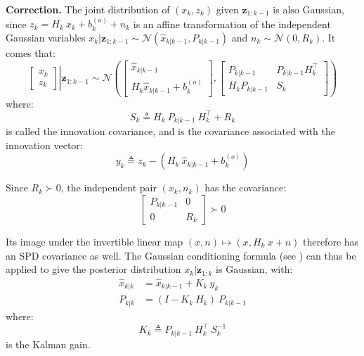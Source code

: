 \textbf{Correction.} The joint distribution of $(x_k,z_k)$ given $\mathbf{z}_{1:k-1}$ is also Gaussian, since $z_k=H_k\:x_k+b_k^{(o)}+n_k$ is an affine transformation of the independent Gaussian variables $x_k|\mathbf{z}_{1:k-1}\sim\mathcal{N}\left(\hat{x}_{k|k-1},P_{k|k-1}\right)$ and $n_k\sim\mathcal{N}(0,R_k)$. It comes that:
\begin{equation}
	\left.\begin{bmatrix}
	x_k\\z_k
	\end{bmatrix}\right|
	\mathbf{z}_{1:k-1}\sim\mathcal{N}
	\left(\begin{bmatrix}
	\hat{x}_{k|k-1}\\H_k\hat{x}_{k|k-1}+b_k^{(o)}
	\end{bmatrix},
	\begin{bmatrix}
	P_{k|k-1}&P_{k|k-1}H_k^\top\\
	H_k P_{k|k-1}&S_k
	\end{bmatrix}\right)
\end{equation}
where:
\begin{equation}
	S_k\triangleq H_k\:P_{k|k-1}\:H_k^\top+R_k
\end{equation}
is called the innovation covariance, and is the covariance associated with the innovation vector:
\begin{equation}
	y_k\triangleq z_k-\left(H_k\:\hat{x}_{k|k-1}+b_k^{(o)}\right)
\end{equation}

Since $R_k\succ0$, the independent pair $(x_k,n_k)$ has the covariance:
\begin{equation}
	\begin{bmatrix}
	P_{k|k-1}&0\\0&R_k
	\end{bmatrix}\succ0
\end{equation}

Its image under the invertible linear map $(x,n)\mapsto(x,H_k\:x+n)$ therefore has an SPD covariance as well. The Gaussian conditioning formula (see ) can thus be applied to give the posterior distribution $x_k|\mathbf{z}_{1:k}$ is Gaussian, with:
\begin{align}
	\hat{x}_{k|k}&=\hat{x}_{k|k-1}+K_k\:y_k\\
	P_{k|k}&=(I-K_k\:H_k)\:P_{k|k-1}
\end{align}
where:
\begin{equation}
	K_k\triangleq P_{k|k-1}\:H_k^\top\:S_k^{-1}
\end{equation}
is the Kalman gain.

